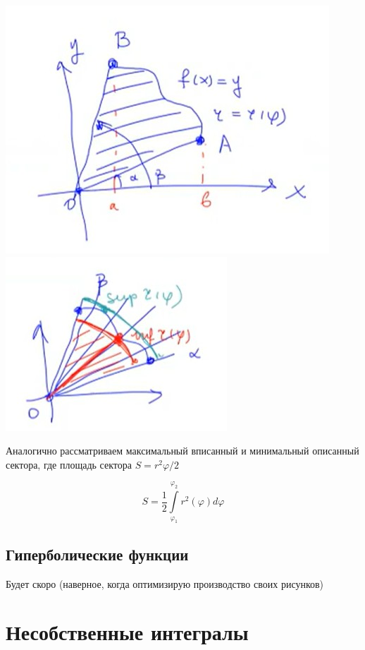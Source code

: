\documentclass[a4paper,11pt]{article}
\renewcommand{\phi}{\ensuremath{\varphi}}
\newcommand{\formula}[1]{
\begin{myquote} 
	\centering
	\begin{equation}
	{#1}
	\end{equation}
\end{myquote}
 }
\begin{document}
\begin{enumerate}[a)]
\begin{multicols}{2}
	\includegraphics[scale = 0.7]{curvepolar.jpg}
	\includegraphics{curvepolar2.jpg}
\end{multicols}

Аналогично рассматриваем максимальный вписанный и минимальный описанный сектора, где площадь сектора $S = r^2 \phi/2$

\formula
{
S = \dfrac{1}{2}\int\limits_{\phi_1}^{\phi_2} r^2(\phi) d\phi
}
\end{enumerate}

\subsection{Гиперболические функции}

Будет скоро (наверное, когда оптимизирую производство своих рисунков)

\section{Несобственные интегралы}
\end{document}
